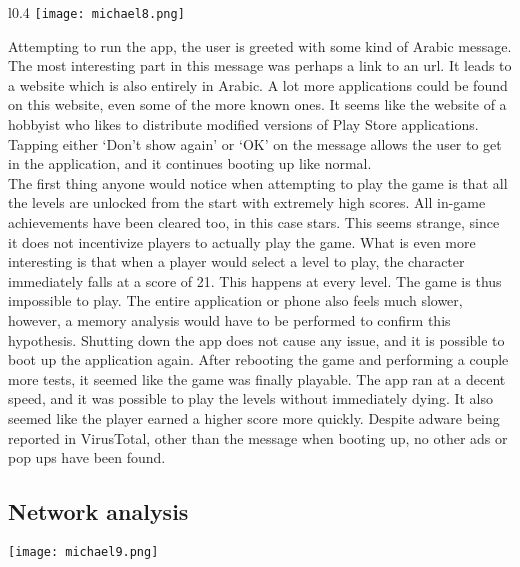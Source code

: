 \begin{minipage}{\linewidth}
\begin{wrapfigure}{l}{0.4\textwidth}
\centering
\texttt{[image: michael8.png]}
\end{wrapfigure}


Attempting to run the app, the user is greeted with some kind of Arabic message. The most interesting part in this message was perhaps a link to an url. It leads to a website which is also entirely in Arabic. A lot more applications could be found on this website, even some of the more known ones. It seems like the website of a hobbyist who likes to distribute modified versions of Play Store applications. Tapping either ‘Don’t show again’ or ‘OK’ on the message allows the user to get in the application, and it continues booting up like normal.\\
The first thing anyone would notice when attempting to play the game is that all the levels are unlocked from the start with extremely high scores. All in-game achievements have been cleared too, in this case stars. This seems strange, since it does not incentivize players to actually play the game. What is even more interesting is that when a player would select a level to play, the character immediately falls at a score of 21. This happens at every level. The game is thus impossible to play. The entire application or phone also feels much slower, however, a memory analysis would have to be performed to confirm this hypothesis. Shutting down the app does not cause any issue, and it is possible to boot up the application again. After rebooting the game and performing a couple more tests, it seemed like the game was finally playable. The app ran at a decent speed, and it was possible to play the levels without immediately dying. It also seemed like the player earned a higher score more quickly. Despite adware being reported in VirusTotal, other than the message when booting up, no other ads or pop ups have been found.

\end{minipage}

\newpage
\subsection{Network analysis}

\begin{center}
\texttt{[image: michael9.png]}
\end{center}


